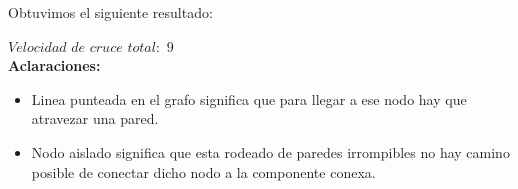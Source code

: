   Obtuvimos el siguiente resultado:

$Velocidad$ $de$ $cruce$ $total: $ $9$\\


\textbf{Aclaraciones:} 
\begin{itemize}
\item Linea punteada en el grafo significa que para llegar a ese nodo hay que atravezar una pared.
\item Nodo aislado significa que esta rodeado de paredes irrompibles no hay camino posible de conectar dicho nodo a la componente conexa.
\end{itemize}
